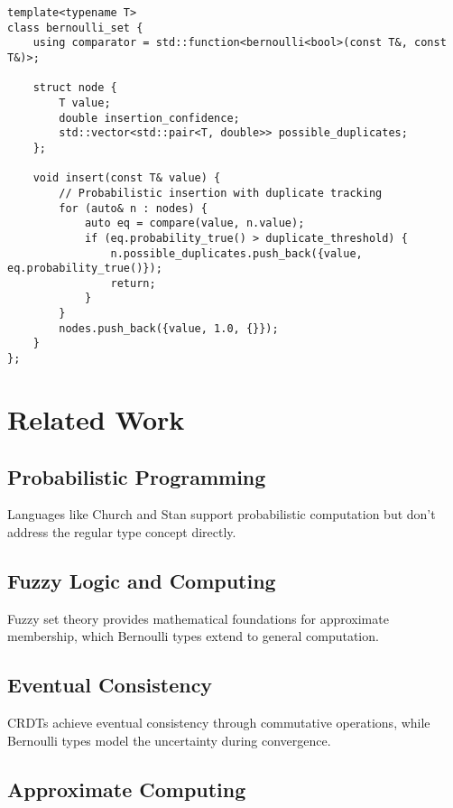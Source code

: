 \documentclass[11pt,final,hidelinks]{article}
\begin{document}
{\begin{verbatim}
template<typename T>
class bernoulli_set {
    using comparator = std::function<bernoulli<bool>(const T&, const T&)>;
    
    struct node {
        T value;
        double insertion_confidence;
        std::vector<std::pair<T, double>> possible_duplicates;
    };
    
    void insert(const T& value) {
        // Probabilistic insertion with duplicate tracking
        for (auto& n : nodes) {
            auto eq = compare(value, n.value);
            if (eq.probability_true() > duplicate_threshold) {
                n.possible_duplicates.push_back({value, eq.probability_true()});
                return;
            }
        }
        nodes.push_back({value, 1.0, {}});
    }
};
\end{verbatim}

\section{Related Work}

\subsection{Probabilistic Programming}

Languages like Church \cite{goodman2008} and Stan \cite{carpenter2017} support probabilistic computation but don't address the regular type concept directly.

\subsection{Fuzzy Logic and Computing}

Fuzzy set theory \cite{zadeh1965} provides mathematical foundations for approximate membership, which Bernoulli types extend to general computation.

\subsection{Eventual Consistency}

CRDTs \cite{shapiro2011} achieve eventual consistency through commutative operations, while Bernoulli types model the uncertainty during convergence.

\subsection{Approximate Computing}

}
\end{document}
